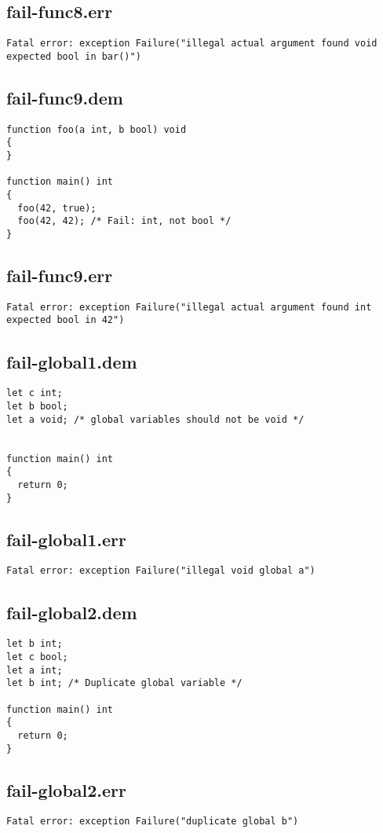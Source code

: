 \subsection{fail-func8.err}
\begin{lstlisting}
Fatal error: exception Failure("illegal actual argument found void expected bool in bar()")
\end{lstlisting}
\subsection{fail-func9.dem}
\begin{lstlisting}
function foo(a int, b bool) void
{
}

function main() int
{
  foo(42, true);
  foo(42, 42); /* Fail: int, not bool */
}
\end{lstlisting}
\subsection{fail-func9.err}
\begin{lstlisting}
Fatal error: exception Failure("illegal actual argument found int expected bool in 42")
\end{lstlisting}
\subsection{fail-global1.dem}
\begin{lstlisting}
let c int;
let b bool;
let a void; /* global variables should not be void */


function main() int
{
  return 0;
}
\end{lstlisting}
\subsection{fail-global1.err}
\begin{lstlisting}
Fatal error: exception Failure("illegal void global a")
\end{lstlisting}
\subsection{fail-global2.dem}
\begin{lstlisting}
let b int;
let c bool;
let a int;
let b int; /* Duplicate global variable */

function main() int
{
  return 0;
}
\end{lstlisting}
\subsection{fail-global2.err}
\begin{lstlisting}
Fatal error: exception Failure("duplicate global b")
\end{lstlisting}

